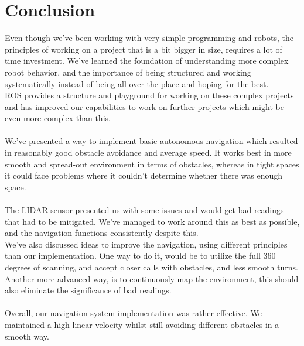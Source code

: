 \documentclass[conference]{IEEEtran}
\begin{document}
\section{Conclusion}\label{conclusion}
Even though we've been working with very simple programming and robots, the principles of working on a project 
that is a bit bigger in size, requires a lot of time investment. 
We've learned the foundation of understanding more complex robot behavior, and the importance of 
being structured and working systematically instead of being all over the place and hoping for the best. \\
ROS provides a structure and playground for working on these complex projects and has improved our capabilities 
to work on further projects which might be even more complex than this. \\\\
We've presented a way to implement basic autonomous navigation which resulted in reasonably good obstacle avoidance 
and average speed. It works best in more smooth and spread-out environment in terms of obstacles, 
whereas in tight spaces it could face problems where it couldn't determine whether there was enough space. \\\\
The LIDAR sensor presented us with some issues and would get bad readings that had to be mitigated. 
We've managed to work around this as best as possible, and the navigation functions consistently despite this. \\
We've also discussed ideas to improve the navigation, using different principles than our implementation. 
One way to do it, would be to utilize the full 360 degrees of scanning, and accept closer calls with obstacles, 
and less smooth turns. Another more advanced way, is to continuously map the environment, this should also eliminate 
the significance of bad readings. \\\\
Overall, our navigation system implementation was rather effective.
We maintained a high linear velocity whilst still avoiding different obstacles in a smooth way. \\
\end{document}
